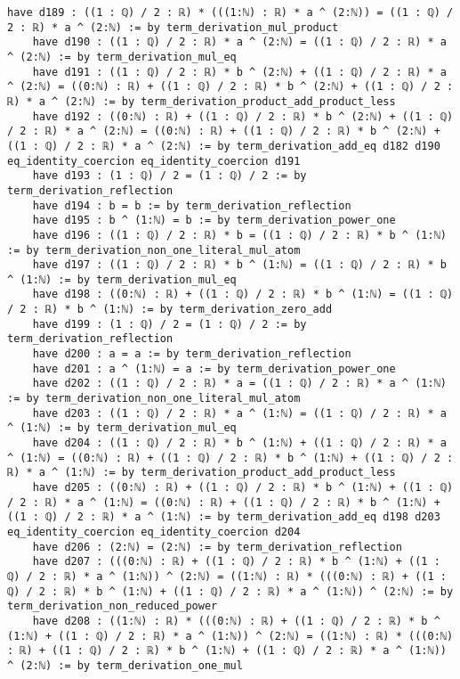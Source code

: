 \documentclass{article}
\begin{document}
\begin{tcolorbox}[colback=white!10, width=\linewidth]
\begin{lstlisting}[language=Lean4]
    have d189 : ((1 : ℚ) / 2 : ℝ) * (((1:ℕ) : ℝ) * a ^ (2:ℕ)) = ((1 : ℚ) / 2 : ℝ) * a ^ (2:ℕ) := by term_derivation_mul_product
    have d190 : ((1 : ℚ) / 2 : ℝ) * a ^ (2:ℕ) = ((1 : ℚ) / 2 : ℝ) * a ^ (2:ℕ) := by term_derivation_mul_eq
    have d191 : ((1 : ℚ) / 2 : ℝ) * b ^ (2:ℕ) + ((1 : ℚ) / 2 : ℝ) * a ^ (2:ℕ) = ((0:ℕ) : ℝ) + ((1 : ℚ) / 2 : ℝ) * b ^ (2:ℕ) + ((1 : ℚ) / 2 : ℝ) * a ^ (2:ℕ) := by term_derivation_product_add_product_less
    have d192 : ((0:ℕ) : ℝ) + ((1 : ℚ) / 2 : ℝ) * b ^ (2:ℕ) + ((1 : ℚ) / 2 : ℝ) * a ^ (2:ℕ) = ((0:ℕ) : ℝ) + ((1 : ℚ) / 2 : ℝ) * b ^ (2:ℕ) + ((1 : ℚ) / 2 : ℝ) * a ^ (2:ℕ) := by term_derivation_add_eq d182 d190 eq_identity_coercion eq_identity_coercion d191
    have d193 : (1 : ℚ) / 2 = (1 : ℚ) / 2 := by term_derivation_reflection
    have d194 : b = b := by term_derivation_reflection
    have d195 : b ^ (1:ℕ) = b := by term_derivation_power_one
    have d196 : ((1 : ℚ) / 2 : ℝ) * b = ((1 : ℚ) / 2 : ℝ) * b ^ (1:ℕ) := by term_derivation_non_one_literal_mul_atom
    have d197 : ((1 : ℚ) / 2 : ℝ) * b ^ (1:ℕ) = ((1 : ℚ) / 2 : ℝ) * b ^ (1:ℕ) := by term_derivation_mul_eq
    have d198 : ((0:ℕ) : ℝ) + ((1 : ℚ) / 2 : ℝ) * b ^ (1:ℕ) = ((1 : ℚ) / 2 : ℝ) * b ^ (1:ℕ) := by term_derivation_zero_add
    have d199 : (1 : ℚ) / 2 = (1 : ℚ) / 2 := by term_derivation_reflection
    have d200 : a = a := by term_derivation_reflection
    have d201 : a ^ (1:ℕ) = a := by term_derivation_power_one
    have d202 : ((1 : ℚ) / 2 : ℝ) * a = ((1 : ℚ) / 2 : ℝ) * a ^ (1:ℕ) := by term_derivation_non_one_literal_mul_atom
    have d203 : ((1 : ℚ) / 2 : ℝ) * a ^ (1:ℕ) = ((1 : ℚ) / 2 : ℝ) * a ^ (1:ℕ) := by term_derivation_mul_eq
    have d204 : ((1 : ℚ) / 2 : ℝ) * b ^ (1:ℕ) + ((1 : ℚ) / 2 : ℝ) * a ^ (1:ℕ) = ((0:ℕ) : ℝ) + ((1 : ℚ) / 2 : ℝ) * b ^ (1:ℕ) + ((1 : ℚ) / 2 : ℝ) * a ^ (1:ℕ) := by term_derivation_product_add_product_less
    have d205 : ((0:ℕ) : ℝ) + ((1 : ℚ) / 2 : ℝ) * b ^ (1:ℕ) + ((1 : ℚ) / 2 : ℝ) * a ^ (1:ℕ) = ((0:ℕ) : ℝ) + ((1 : ℚ) / 2 : ℝ) * b ^ (1:ℕ) + ((1 : ℚ) / 2 : ℝ) * a ^ (1:ℕ) := by term_derivation_add_eq d198 d203 eq_identity_coercion eq_identity_coercion d204
    have d206 : (2:ℕ) = (2:ℕ) := by term_derivation_reflection
    have d207 : (((0:ℕ) : ℝ) + ((1 : ℚ) / 2 : ℝ) * b ^ (1:ℕ) + ((1 : ℚ) / 2 : ℝ) * a ^ (1:ℕ)) ^ (2:ℕ) = ((1:ℕ) : ℝ) * (((0:ℕ) : ℝ) + ((1 : ℚ) / 2 : ℝ) * b ^ (1:ℕ) + ((1 : ℚ) / 2 : ℝ) * a ^ (1:ℕ)) ^ (2:ℕ) := by term_derivation_non_reduced_power
    have d208 : ((1:ℕ) : ℝ) * (((0:ℕ) : ℝ) + ((1 : ℚ) / 2 : ℝ) * b ^ (1:ℕ) + ((1 : ℚ) / 2 : ℝ) * a ^ (1:ℕ)) ^ (2:ℕ) = ((1:ℕ) : ℝ) * (((0:ℕ) : ℝ) + ((1 : ℚ) / 2 : ℝ) * b ^ (1:ℕ) + ((1 : ℚ) / 2 : ℝ) * a ^ (1:ℕ)) ^ (2:ℕ) := by term_derivation_one_mul

\end{lstlisting}
\end{tcolorbox}
\end{document}
